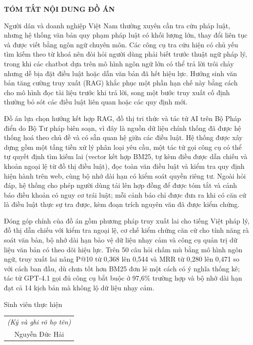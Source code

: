 \documentclass[../DoAn.tex]{subfiles}
\begin{document}
\begin{center}
    \Large{\textbf{TÓM TẮT NỘI DUNG ĐỒ ÁN}}\\
\end{center}
\vspace{1cm}
Người dân và doanh nghiệp Việt Nam thường xuyên cần tra cứu pháp luật, nhưng hệ thống văn bản quy phạm pháp luật có khối lượng lớn, thay đổi liên tục và được viết bằng ngôn ngữ chuyên môn. Các công cụ tra cứu hiện có chủ yếu tìm kiếm theo từ khoá nên đòi hỏi người dùng phải biết trước thuật ngữ pháp lý, trong khi các chatbot dựa trên mô hình ngôn ngữ lớn có thể trả lời trôi chảy nhưng dễ bịa đặt điều luật hoặc dẫn văn bản đã hết hiệu lực. Hướng sinh văn bản tăng cường truy xuất (RAG) khắc phục một phần hạn chế này bằng cách cho mô hình đọc tài liệu trước khi trả lời, song một bước truy xuất cố định thường bỏ sót các điều luật liên quan hoặc các quy định mới.

Đồ án lựa chọn hướng kết hợp RAG, đồ thị tri thức và tác tử AI trên Bộ Pháp điển do Bộ Tư pháp biên soạn, vì đây là nguồn dữ liệu chính thống đã được hệ thống hoá theo chủ đề và có sẵn quan hệ giữa các điều luật. Hệ thống được xây dựng gồm một tầng tiền xử lý phân loại yêu cầu, một tác tử gọi công cụ có thể tự quyết định tìm kiếm lai (vector kết hợp BM25, tự kèm điều được dẫn chiếu và khoản ngoại lệ từ đồ thị điều luật), đọc toàn văn điều luật và kiểm tra quy định hiện hành trên web, cùng bộ nhớ dài hạn có kiểm soát quyền riêng tư. Ngoài hỏi đáp, hệ thống cho phép người dùng tải lên hợp đồng để được tóm tắt và cảnh báo điều khoản có nguy cơ trái luật; mỗi cảnh báo chỉ được đưa ra khi có căn cứ là điều luật thực sự tra được, kèm đoạn trích nguyên văn đã được kiểm chứng.

Đóng góp chính của đồ án gồm phương pháp truy xuất lai cho tiếng Việt pháp lý, đồ thị dẫn chiếu với kiểm tra ngoại lệ, cơ chế kiểm chứng căn cứ cho tính năng rà soát văn bản, bộ nhớ dài hạn bảo vệ dữ liệu nhạy cảm và công cụ quản trị dữ liệu văn bản có theo dõi hiệu lực. Trên 50 câu hỏi chấm mù bằng mô hình ngôn ngữ, truy xuất lai nâng P@10 từ 0,368 lên 0,544 và MRR từ 0,280 lên 0,471 so với cách ban đầu, dù chưa tốt hơn BM25 đơn lẻ một cách có ý nghĩa thống kê; tác tử GPT-4.1 gọi đủ công cụ bắt buộc ở 97,6\% trường hợp và bộ nhớ dài hạn đạt cả 14 kịch bản mà không lộ dữ liệu nhạy cảm.

\begin{flushright}
Sinh viên thực hiện\\
\begin{tabular}{@{}c@{}}
\textit{(Ký và ghi rõ họ tên)}\\[2cm]
Nguyễn Đức Hải
\end{tabular}
\end{flushright}
\end{document}
